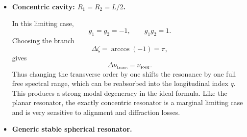 \begin{resolucao}[Solution]
\begin{itemize}
            Then
            \begin{equation}
                g_1=g_2=0,
                \qquad
                g_1g_2=0.
            \end{equation}
            Therefore,
            \begin{equation}
                \Delta\zeta
                =
                \arccos(0)
                =
                \frac{\pi}{2},
            \end{equation}
            and
            \begin{equation}
                \Delta\nu_{\mathrm{trans}}
                =
                \frac{\nu_{\mathrm{FSR}}}{2}.
            \end{equation}
            Thus adjacent transverse orders are shifted by half of the longitudinal free spectral range. Consequently, modes with total order differing by two can overlap with neighboring longitudinal modes. For example,
            \begin{equation}
                \nu_{N=2,q}
                =
                \nu_{N=0,q+1}.
            \end{equation}
            This is the degeneracy pattern emphasized in Saleh and Teich's discussion of the symmetric confocal resonator.

            \item \textbf{Concentric cavity: $R_1=R_2=L/2$.}

            In this limiting case,
            \begin{equation}
                g_1=g_2=-1,
                \qquad
                g_1g_2=1.
            \end{equation}
            Choosing the branch
            \[
                \Delta\zeta=\arccos(-1)=\pi,
            \]
            gives
            \begin{equation}
                \Delta\nu_{\mathrm{trans}}
                =
                \nu_{\mathrm{FSR}}.
            \end{equation}
            Thus changing the transverse order by one shifts the resonance by one full free spectral range, which can be reabsorbed into the longitudinal index $q$. This produces a strong modal degeneracy in the ideal formula. Like the planar resonator, the exactly concentric resonator is a marginal limiting case and is very sensitive to alignment and diffraction losses.

            \item \textbf{Generic stable spherical resonator.}


\end{itemize}
\end{resolucao}
